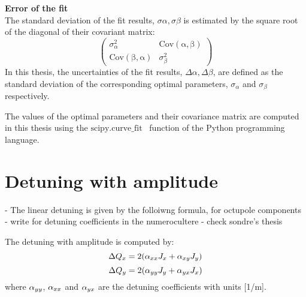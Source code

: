\normalsize{\textbf{Error of the fit}}\\
The standard deviation of the fit results, $\sigma \alpha, \sigma \beta$ is estimated by the square root of the diagonal of their covariant matrix:
\begin{equation}\label{eq:cov_matrix_fit_results}
    \begin{pmatrix}
        \sigma_{\alpha}^2 & \mathrm{Cov(\alpha, \beta)}\\
        \mathrm{Cov(\beta, \alpha)} & \sigma_{\beta}^2
        \end{pmatrix}
\end{equation}
In this thesis, the uncertainties of the fit results, $\Delta \alpha, \Delta \beta$, are defined as the standard deviation of the corresponding optimal parameters, $\sigma_{\alpha}$ and  $\sigma_{\beta}$ respectively.

The values of the optimal parameters and their covariance matrix are computed in this thesis using the $\mathrm{scipy.curve \_ fit}$~\cite{scipy_curve_fit} function of the Python programming language.


\section{Detuning with amplitude}\label{app:detuning_with_amplitude}
- The linear detuning is given by the folloiwng formula, for octupole components
- write for detuning coefficients in the numerocultere
- check sondre's thesis

The detuning with amplitude is computed by:
\begin{equation}\label{eq:x_amplDetuning}
    \Delta Q_x = 2({\alpha_{xx}} {J_x} + \alpha_{xy} {J_y})
\end{equation}
\begin{equation}\label{eq:y_amplDetuning}
    \Delta Q_y = 2({\alpha_{yy}} {J_y} + \alpha_{yx} {J_x})
\end{equation}
where ${\alpha_{yy}}$, ${\alpha_{xx}}$ and ${\alpha_{yx}}$ are the detuning coefficients with units [1/m].


